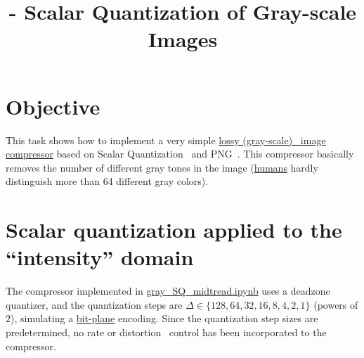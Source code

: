

\title{\SM{} - Scalar Quantization of Gray-scale Images}

\maketitle
\tableofcontents

\section{Objective}
This task shows how to implement a very simple
\href{https://en.wikipedia.org/wiki/Lossy_compression}{lossy
  (gray-scale)~\cite{vruiz__image_IO} image compressor} based on
Scalar
Quantization~\cite{vruiz__scalar_quantization,sayood2017introduction,vetterli2014foundations}
and PNG~\cite{vruiz__PNG}. This compressor basically removes the
number of different gray tones in the image
(\href{https://en.wikipedia.org/wiki/Visual_system}{humans} hardly
distinguish more than 64 different gray colors).

\section{Scalar quantization applied to the ``intensity'' domain}
The compressor implemented in
\href{https://github.com/Sistemas-Multimedia/Sistemas-Multimedia.github.io/blob/master/contents/gray_SQ/gray_SQ_midtread.ipynb}{gray\_SQ\_midtread.ipynb}
uses a deadzone quantizer, and the quantization steps are
$\Delta\in\{128, 64, 32, 16, 8, 4, 2, 1\}$ (powers of $2$), simulating
a \href{https://en.wikipedia.org/wiki/Bit_plane}{bit-plane}
encoding. Since the quantization step sizes are predetermined, no rate
or distortion~\cite{vruiz__information_theory} control has been
incorporated to the compressor.

